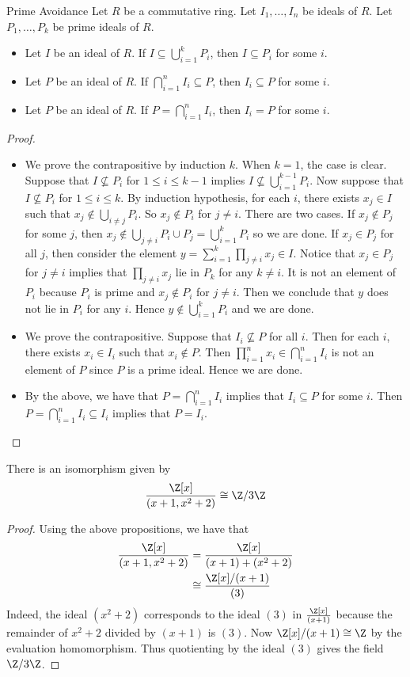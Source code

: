 \documentclass[a4paper]{article}
\begin{document}
\begin{prp}{Prime Avoidance}{} Let $R$ be a commutative ring. Let $I_1,\dots,I_n$ be ideals of $R$. Let $P_1,\dots,P_k$ be prime ideals of $R$. 
\begin{itemize}
\item Let $I$ be an ideal of $R$. If $I\subseteq\bigcup_{i=1}^kP_i$, then $I\subseteq P_i$ for some $i$. 
\item Let $P$ be an ideal of $R$. If $\bigcap_{i=1}^nI_i\subseteq P$, then $I_i\subseteq P$ for some $i$. 
\item Let $P$ be an ideal of $R$. If $P=\bigcap_{i=1}^nI_i$, then $I_i=P$ for some $i$. 
\end{itemize} 
\begin{proof}
\begin{itemize}
\item We prove the contrapositive by induction $k$. When $k=1$, the case is clear. Suppose that $I\not\subseteq P_i$ for $1\leq i\leq k-1$ implies $I\not\subseteq\bigcup_{i=1}^{k-1}P_i$. Now suppose that $I\not\subseteq P_i$ for $1\leq i\leq k$. By induction hypothesis, for each $i$, there exists $x_j\in I$ such that $x_j\notin\bigcup_{i\neq j}P_i$. So $x_j\notin P_i$ for $j\neq i$. There are two cases. If $x_j\notin P_j$ for some $j$, then $x_j\notin\bigcup_{j\neq i}P_i\cup P_j=\bigcup_{i=1}^kP_i$ so we are done. If $x_j\in P_j$ for all $j$, then consider the element $y=\sum_{i=1}^k\prod_{j\neq i}x_j\in I$. Notice that $x_j\in P_j$ for $j\neq i$ implies that $\prod_{j\neq i}x_j$ lie in $P_k$ for any $k\neq i$. It is not an element of $P_i$ because $P_i$ is prime and $x_j\notin P_i$ for $j\neq i$. Then we conclude that $y$ does not lie in $P_i$ for any $i$. Hence $y\notin\bigcup_{i=1}^kP_i$ and we are done. 
\item We prove the contrapositive. Suppose that $I_i\not\subseteq P$ for all $i$. Then for each $i$, there exists $x_i\in I_i$ such that $x_i\notin P$. Then $\prod_{i=1}^nx_i\in\bigcap_{i=1}^nI_i$ is not an element of $P$ since $P$ is a prime ideal. Hence we are done. 
\item By the above, we have that $P=\bigcap_{i=1}^nI_i$ implies that $I_i\subseteq P$ for some $i$. Then $P=\bigcap_{i=1}^nI_i\subseteq I_i$ implies that $P=I_i$. 
\end{itemize}
\end{proof}
\end{prp}

\begin{eg}{}{} There is an isomorphism given by $$\frac{\Z[x]}{(x+1,x^2+2)}\cong\Z/3\Z$$ 
\begin{proof}
Using the above propositions, we have that 
\begin{align*}
\frac{\Z[x]}{(x+1,x^2+2)}&=\frac{\Z[x]}{(x+1)+(x^2+2)}\\
&\cong\frac{\Z[x]/(x+1)}{(3)}
\end{align*}
Indeed, the ideal $(x^2+2)$ corresponds to the ideal $(3)$ in $\frac{\Z[x]}{(x+1)}$ because the remainder of $x^2+2$ divided by $(x+1)$ is $(3)$. Now $\Z[x]/(x+1)\cong\Z$ by the evaluation homomorphism. Thus quotienting by the ideal $(3)$ gives the field $\Z/3\Z$. 
\end{proof}
\end{eg}
\end{document}

